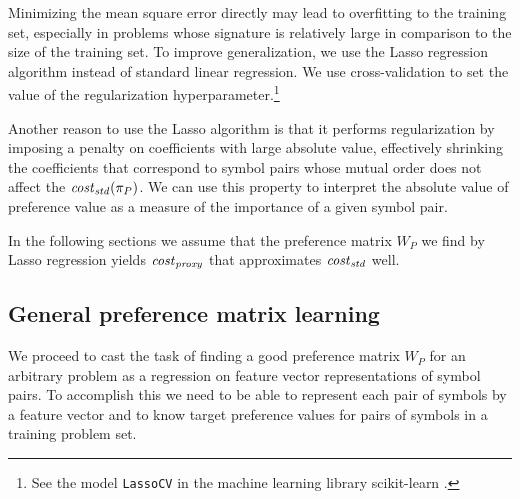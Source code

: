 \documentclass{ceurart}
\begin{document}
Minimizing the mean square error directly may lead to overfitting to the training set,
especially in problems whose signature is relatively large in comparison to the size of the training set.
To improve generalization,
we use the Lasso regression algorithm \cite{Tibshirani1996} instead of standard linear regression.
We use cross-validation to set the value of the regularization hyperparameter.\footnote{See the model \texttt{LassoCV} in the machine learning library scikit-learn \cite{scikit-learn}.}

Another reason to use the Lasso algorithm is that it performs regularization
by imposing a penalty on coefficients with large absolute value,
effectively shrinking the coefficients that correspond to symbol pairs
whose mutual order does not affect the \(\operatorname{\mathit{\operatorname{\mathit{cost}}_{std}}}(\pi_P)\).
We can use this property to interpret the absolute value of preference value
as a measure of the importance of a given symbol pair.

In the following sections we assume that the preference matrix \(W_P\) we find by Lasso regression
yields \(\operatorname{\mathit{\operatorname{\mathit{cost}}_{proxy}}}\) that approximates \(\operatorname{\mathit{\operatorname{\mathit{cost}}_{std}}}\) well.


\subsection{General preference matrix learning}
\label{sec:general-preference}

We proceed to cast the task of finding a good preference matrix \(W_P\)
for an arbitrary problem as a regression on feature vector representations of symbol pairs.
To accomplish this we need to be able to represent each pair of symbols by a feature vector
and to know target preference values for pairs of symbols in a training problem set.
\end{document}

